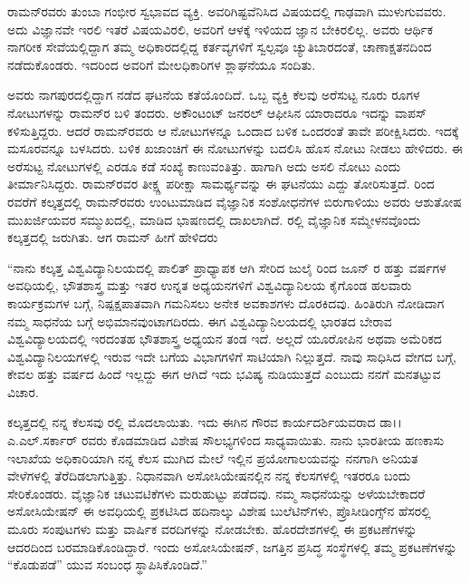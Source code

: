 
ರಾಮನ್‍ರವರು ತುಂಬಾ ಗಂಭೀರ ಸ್ವಭಾವದ ವ್ಯಕ್ತಿ. ಅವರಿಗಿಷ್ಟವೆನಿಸಿದ ವಿಷಯದಲ್ಲಿ ಗಾಢವಾಗಿ ಮುಳುಗುವವರು. ಅದು ವಿಜ್ಞಾನವೇ ಇರಲಿ ಇತರೆ ವಿಷಯವಿರಲಿ, ಅವರಿಗೆ ಆಳಕ್ಕೆ ಇಳಿಯದ ಜ್ಞಾನ ಬೇಕಿರಲಿಲ್ಲ. ಅವರು ಆರ್ಥಿಕ ನಾಗರೀಕ ಸೇವೆಯಲ್ಲಿದ್ದಾಗ ತಮ್ಮ ಅಧಿಕಾರದಲ್ಲಿದ್ದ ಕರ್ತವ್ಯಗಳಿಗೆ ಸ್ವಲ್ಪವೂ ಚ್ಯುತಿಬಾರದಂತೆ, ಚಾಣಾಕ್ಷತನದಿಂದ ನಡೆದುಕೊಂಡರು. ಇದರಿಂದ ಅವರಿಗೆ ಮೇಲಧಿಕಾರಿಗಳ ಶ್ಲಾಘನೆಯೂ ಸಂದಿತು.

ಅವರು ನಾಗಪುರದಲ್ಲಿದ್ದಾಗ ನಡೆದ ಘಟನೆಯ ಕತೆಯೊಂದಿದೆ. ಒಬ್ಬ ವ್ಯಕ್ತಿ ಕೆಲವು ಅರೆಸುಟ್ಟ ನೂರು ರೂಗಳ ನೋಟುಗಳನ್ನು ರಾಮನ್‍ರ ಬಳಿ ತಂದರು. ಅಕೌಂಟಂಟ್ ಜನರಲ್ ಆಫೀಸಿನ ಯಾರಾದರೂ ಇದನ್ನು ವಾಪಸ್ ಕಳಿಸುತ್ತಿದ್ದರು. ಆದರೆ ರಾಮನ್‍ರವರು ಆ ನೋಟುಗಳನ್ನೂ ಒಂದಾದ ಬಳಿಕ ಒಂದರಂತೆ ತಾವೇ ಪರೀಕ್ಷಿಸಿದರು. ಇದಕ್ಕೆ ಮಸೂರವನ್ನೂ ಬಳಸಿದರು. ಬಳಿಕ ಖಜಾಂಚಿಗೆ ಈ ನೋಟುಗಳನ್ನು ಬದಲಿಸಿ ಹೊಸ ನೋಟು ನೀಡಲು ಹೇಳಿದರು. ಈ ಅರೆಸುಟ್ಟ ನೋಟುಗಳಲ್ಲಿ ಎರಡೂ ಕಡೆ ಸಂಖ್ಯೆ ಕಾಣುವಂತಿತ್ತು. ಹಾಗಾಗಿ ಅದು ಅಸಲಿ ನೋಟು ಎಂದು ತೀರ್ಮಾನಿಸಿದ್ದರು. ರಾಮನ್‍ರವರ ತೀಕ್ಷ್ಣ ಪರೀಕ್ಷಾ ಸಾಮರ್ಥ್ಯವನ್ನು ಈ ಘಟನೆಯು ಎದ್ದು ತೋರಿಸುತ್ತದೆ.  ರಿಂದ  ರವರೆಗೆ ಕಲ್ಕತ್ತದಲ್ಲಿ ರಾಮನ್‍ರವರು ಉಂಟುಮಾಡಿದ ವೈಜ್ಞಾನಿಕ ಸಂಶೋಧನೆಗಳ ಬಿರುಗಾಳಿಯು ಅವರು ಆಶುತೋಷ ಮುಖರ್ಜಿಯವರ ಸಮ್ಮುಖದಲ್ಲಿ, ಮಾಡಿದ ಭಾಷಣದಲ್ಲಿ ದಾಖಲಾಗಿದೆ. ರಲ್ಲಿ ವೈಜ್ಞಾನಿಕ ಸಮ್ಮೇಳನವೊಂದು ಕಲ್ಕತ್ತದಲ್ಲಿ ಜರುಗಿತು. ಆಗ ರಾಮನ್ ಹೀಗೆ ಹೇಳಿದರು

“ನಾನು ಕಲ್ಕತ್ತ ವಿಶ್ವವಿದ್ಯಾನಿಲಯದಲ್ಲಿ ಪಾಲಿತ್ ಪ್ರಾಧ್ಯಾಪಕ ಆಗಿ ಸೇರಿದ ಜುಲೈ  ರಿಂದ ಜೂನ್ ರ ಹತ್ತು ವರ್ಷಗಳ ಅವಧಿಯಲ್ಲಿ, ಭೌತಶಾಸ್ತ್ರ ಮತ್ತು ಇತರ ಉನ್ನತ ಅಧ್ಯಯನಗಳಿಗೆ ವಿಶ್ವವಿದ್ಯಾನಿಲಯ ಕೈಗೊಂಡ ಹಲವಾರು ಕಾರ್ಯಕ್ರಮಗಳ ಬಗ್ಗೆ, ನಿಷ್ಪಕ್ಷಪಾತವಾಗಿ ಗಮನಿಸಲು ಅನೇಕ ಅವಕಾಶಗಳು ದೊರಕಿದವು. ಹಿಂತಿರುಗಿ ನೋಡಿದಾಗ ನಮ್ಮ ಸಾಧನೆಯ ಬಗ್ಗೆ ಅಭಿಮಾನವುಂಟಾಗದಿರದು. ಈಗ ವಿಶ್ವವಿದ್ಯಾನಿಲಯದಲ್ಲಿ ಭಾರತದ ಬೇರಾವ ವಿಶ್ವವಿದ್ಯಾಲಯದಲ್ಲಿ ಇರದಂತಹ ಭೌತಶಾಸ್ತ್ರ ಅಧ್ಯಯನ ತಂಡ ಇದೆ. ಅಲ್ಲದೆ ಯೂರೋಪಿನ ಅಥವಾ ಅಮೆರಿಕದ ವಿಶ್ವವಿದ್ಯಾನಿಲಯಗಳಲ್ಲಿ ಇರುವ ಇದೇ ಬಗೆಯ ವಿಭಾಗಗಳಿಗೆ ಸಾಟಿಯಾಗಿ ನಿಲ್ಲುತ್ತದೆ. ನಾವು ಸಾಧಿಸಿದ ವೇಗದ ಬಗ್ಗೆ, ಕೇವಲ ಹತ್ತು ವರ್ಷದ ಹಿಂದೆ ಇಲ್ಲದ್ದು ಈಗ ಆಗಿದೆ ಇದು ಭವಿಷ್ಯ ನುಡಿಯುತ್ತದೆ ಎಂಬುದು ನನಗೆ ಮನತಟ್ಟುವ ವಿಚಾರ.

ಕಲ್ಕತ್ತದಲ್ಲಿ ನನ್ನ ಕೆಲಸವು ರಲ್ಲಿ ಮೊದಲಾಯಿತು. ಇದು ಈಗಿನ ಗೌರವ ಕಾರ್ಯದರ್ಶಿ\-ಯವರಾದ ಡಾ।। ಎ.ಎಲ್.ಸರ್ಕಾರ್ ರವರು ಕೊಡಮಾಡಿದ ವಿಶೇಷ ಸೌಲಭ್ಯಗಳಿಂದ ಸಾಧ್ಯವಾಯಿತು. ನಾನು ಭಾರತೀಯ ಹಣಕಾಸು ಇಲಾಖೆಯ ಅಧಿಕಾರಿಯಾಗಿ ನನ್ನ ಕೆಲಸ ಮುಗಿದ ಮೇಲೆ ಇಲ್ಲಿನ ಪ್ರಯೋಗಾಲಯವನ್ನು ನನಗಾಗಿ ಅನಿಯತ ವೇಳೆಗಳಲ್ಲಿ ತೆರೆದಿಡಲಾಗುತ್ತಿತ್ತು. ನಿಧಾನವಾಗಿ ಅಸೋಸಿಯೇಷನಲ್ಲಿನ ನನ್ನ ಕೆಲಸಗಳಲ್ಲಿ ಇತರರೂ ಬಂದು ಸೇರಿಕೊಂಡರು. ವೈಜ್ಞಾನಿಕ ಚಟುವಟಿಕೆ\-ಗಳು ಮರುಹುಟ್ಟು ಪಡೆದವು. ನಮ್ಮ ಸಾಧನೆಯನ್ನು ಅಳೆಯಬೇಕಾದರೆ ಅಸೋಸಿಯೇಷನ್ ಈ ಅವಧಿಯಲ್ಲಿ ಪ್ರಕಟಿಸಿದ ಹದಿನಾಲ್ಕು ವಿಶೇಷ ಬುಲೆಟಿನ್‍ಗಳು, ಪ್ರೊಸೀಡಿಂಗ್ಸ್‌ನ ಹೆಸರಲ್ಲಿ ಮೂರು ಸಂಪುಟಗಳು ಮತ್ತು ವಾರ್ಷಿಕ ವರದಿಗಳನ್ನು ನೋಡಬೇಕು. ಹೊರದೇಶಗಳಲ್ಲಿ ಈ ಪ್ರಕಟಣೆಗಳನ್ನು ಆದರದಿಂದ ಬರಮಾಡಿಕೊಂಡಿದ್ದಾರೆ. ಇಂದು ಅಸೋಸಿಯೇಷನ್, ಜಗತ್ತಿನ ಪ್ರಸಿದ್ಧ ಸಂಸ್ಥೆಗಳಲ್ಲಿ ತಮ್ಮ ಪ್ರಕಟಣೆಗಳನ್ನು “ಕೊಡುಪಡೆ” ಯುವ ಸಂಬಂಧ ಸ್ಥಾಪಿಸಿಕೊಂಡಿದೆ.”

